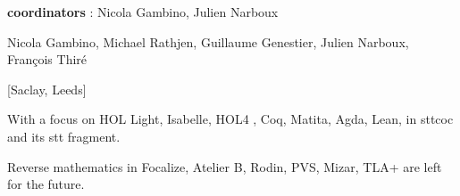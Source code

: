 {\bf coordinators} : Nicola Gambino, Julien Narboux 

Nicola Gambino, Michael Rathjen, Guillaume Genestier, Julien Narboux,
François Thiré

[Saclay, Leeds]

With a focus on HOL Light, Isabelle, HOL4 , Coq,
Matita, Agda, Lean, in sttcoc and its stt fragment.

Reverse mathematics in Focalize, Atelier B, Rodin, PVS, Mizar, TLA+
are left for the future.

